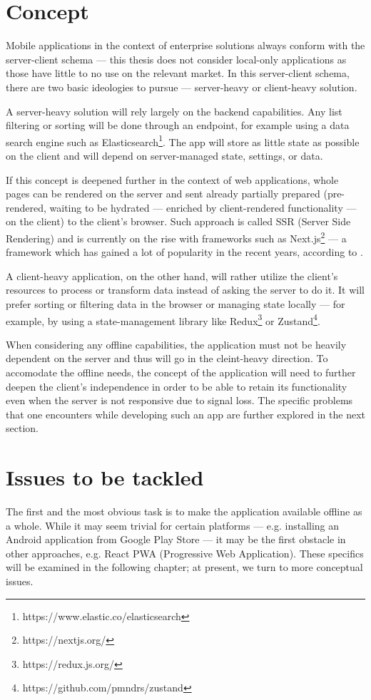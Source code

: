 \documentclass[
  digital,     %
  color,       %
  oneside,     %
  nosansbold,  %
  nocolorbold, %
  lof,         %
  lot,         %
]{fithesis4}
\begin{document}
\section{Concept}
Mobile applications in the context of enterprise solutions always conform with the server-client schema --- this thesis does not consider local-only applications as those have little to no use on the relevant market. In this server-client schema, there are two basic ideologies to pursue --- server-heavy or client-heavy solution. 

A server-heavy solution will rely largely on the backend capabilities. Any list filtering or sorting will be done through an endpoint, for example using a data search engine such as Elasticsearch\footnote{https://www.elastic.co/elasticsearch}. The app will store as little state as possible on the client and will depend on server-managed state, settings, or data. 

If this concept is deepened further in the context of web applications, whole pages can be rendered on the server and sent already partially prepared (pre-rendered, waiting to be hydrated --- enriched by client-rendered functionality --- on the client) to the client's browser. Such approach is called SSR (Server Side Rendering) and is currently on the rise with frameworks such as Next.js\footnote{https://nextjs.org/} --- a framework which has gained a lot of popularity in the recent years, according to .

A client-heavy application, on the other hand, will rather utilize the client's resources to process or transform data instead of asking the server to do it. It will prefer sorting or filtering data in the browser or managing state locally --- for example, by using a state-management library like Redux\footnote{https://redux.js.org/} or Zustand\footnote{https://github.com/pmndrs/zustand}.

When considering any offline capabilities, the application must not be heavily dependent on the server and thus will go in the cleint-heavy direction. To accomodate the offline needs, the concept of the application will need to further deepen the client's independence in order to be able to retain its functionality even when the server is not responsive due to signal loss. The specific problems that one encounters while developing such an app are further explored in the next section.
\section{Issues to be tackled}
The first and the most obvious task is to make the application available offline as a whole. While it may seem trivial for certain platforms --- e.g. installing an Android application from Google Play Store --- it may be the first obstacle in other approaches, e.g. React PWA (Progressive Web Application). These specifics will be examined in the following chapter; at present, we turn to more conceptual issues.
\end{document}
